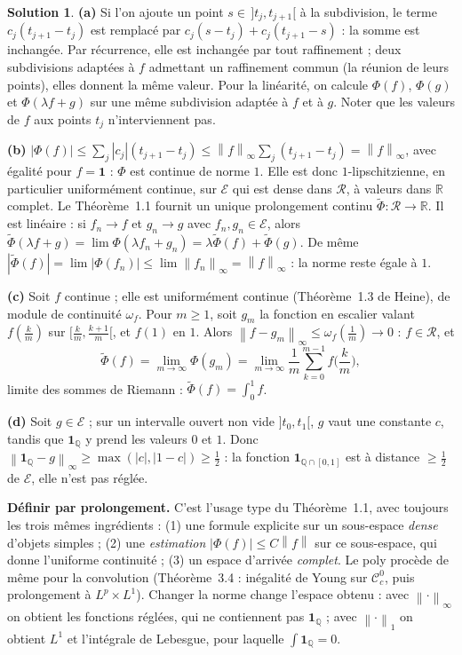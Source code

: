 \documentclass[11pt,a4paper]{article}
\newcommand{\R}{\mathbb{R}}
\newcommand{\Q}{\mathbb{Q}}
\newcommand{\norm}[1]{\left\|#1\right\|}
\newcommand{\Cc}{\mathcal{C}^0_c}
\theoremstyle{definition}
\newtheorem*{solution}{Solution}
\begin{document}
\begin{solution}
\noindent\textbf{(a)} Si l'on ajoute un point $s\in\,]t_j,t_{j+1}[$ à la subdivision, le terme $c_j(t_{j+1}-t_j)$ est remplacé par $c_j(s-t_j)+c_j(t_{j+1}-s)$ : la somme est inchangée. Par récurrence, elle est inchangée par tout raffinement ; deux subdivisions adaptées à $f$ admettant un raffinement commun (la réunion de leurs points), elles donnent la même valeur. Pour la linéarité, on calcule $\Phi(f)$, $\Phi(g)$ et $\Phi(\lambda f+g)$ sur une même subdivision adaptée à $f$ et à $g$. Noter que les valeurs de $f$ aux points $t_j$ n'interviennent pas.

\medskip
\noindent\textbf{(b)} $|\Phi(f)|\le\sum_j|c_j|(t_{j+1}-t_j)\le\norm f_\infty\sum_j(t_{j+1}-t_j)=\norm f_\infty$, avec égalité pour $f=\mathbf 1$ : $\Phi$ est continue de norme $1$. Elle est donc $1$-lipschitzienne, en particulier uniformément continue, sur $\mathcal E$ qui est dense dans $\mathcal R$, à valeurs dans $\R$ complet. Le Théorème~1.1 fournit un unique prolongement continu $\widetilde\Phi:\mathcal R\to\R$. Il est linéaire : si $f_n\to f$ et $g_n\to g$ avec $f_n,g_n\in\mathcal E$, alors $\widetilde\Phi(\lambda f+g)=\lim\Phi(\lambda f_n+g_n)=\lambda\widetilde\Phi(f)+\widetilde\Phi(g)$. De même $|\widetilde\Phi(f)|=\lim|\Phi(f_n)|\le\lim\norm{f_n}_\infty=\norm f_\infty$ : la norme reste égale à $1$.

\medskip
\noindent\textbf{(c)} Soit $f$ continue ; elle est uniformément continue (Théorème~1.3 de Heine), de module de continuité $\omega_f$. Pour $m\ge1$, soit $g_m$ la fonction en escalier valant $f(\frac km)$ sur $[\frac km,\frac{k+1}m[$, et $f(1)$ en $1$. Alors $\norm{f-g_m}_\infty\le\omega_f(\frac1m)\to0$ : $f\in\mathcal R$, et
\[
\widetilde\Phi(f)=\lim_{m\to\infty}\Phi(g_m)=\lim_{m\to\infty}\frac1m\sum_{k=0}^{m-1}f\Big(\frac km\Big),
\]
limite des sommes de Riemann : $\widetilde\Phi(f)=\int_0^1f$.

\medskip
\noindent\textbf{(d)} Soit $g\in\mathcal E$ ; sur un intervalle ouvert non vide $]t_0,t_1[$, $g$ vaut une constante $c$, tandis que $\mathbf 1_\Q$ y prend les valeurs $0$ et $1$. Donc $\norm{\mathbf 1_\Q-g}_\infty\ge\max(|c|,|1-c|)\ge\frac12$ : la fonction $\mathbf 1_{\Q\cap[0,1]}$ est à distance $\ge\frac12$ de $\mathcal E$, elle n'est pas réglée.
\end{solution}

\begin{pointcle}
\textbf{Définir par prolongement.} C'est l'usage type du Théorème~1.1, avec toujours les trois mêmes ingrédients : (1) une formule explicite sur un sous-espace \emph{dense} d'objets simples ; (2) une \emph{estimation} $|\Phi(f)|\le C\norm f$ sur ce sous-espace, qui donne l'uniforme continuité ; (3) un espace d'arrivée \emph{complet}. Le poly procède de même pour la convolution (Théorème~3.4 : inégalité de Young sur $\Cc$, puis prolongement à $L^p\times L^1$). Changer la norme change l'espace obtenu : avec $\norm\cdot_\infty$ on obtient les fonctions réglées, qui ne contiennent pas $\mathbf 1_\Q$ ; avec $\norm\cdot_1$ on obtient $L^1$ et l'intégrale de Lebesgue, pour laquelle $\int\mathbf 1_\Q=0$.
\end{pointcle}
\end{document}

